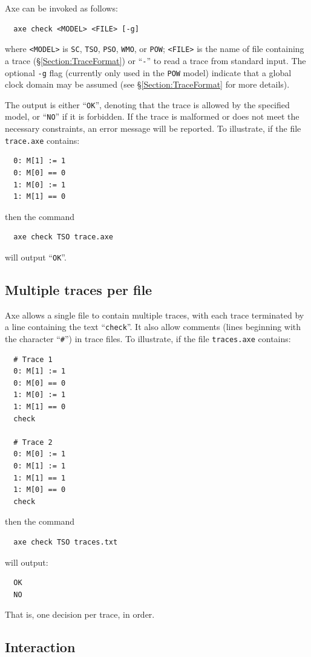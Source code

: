 \documentclass[11pt]{article}
\begin{document}
Axe can be invoked as follows:
\begin{verbatim}
  axe check <MODEL> <FILE> [-g]
\end{verbatim}
\noindent where \verb!<MODEL>! is \verb!SC!, \verb!TSO!, \verb!PSO!,
\verb!WMO!, or \verb!POW!; \verb!<FILE>! is the name of file
containing a trace (\S\ref{Section:TraceFormat}) or ``\verb!-!'' to read a
trace from standard input.  The optional \verb!-g! flag (currently
only used in the \verb!POW! model) indicate that a global clock domain
may be assumed (see \S\ref{Section:TraceFormat} for more details).

The output is either ``\verb!OK!'', denoting that the trace is allowed by
the specified model, or ``\verb!NO!'' if it is forbidden.  If the trace is
malformed or does not meet the necessary constraints, an error message
will be reported.
To illustrate, if the file \verb!trace.axe! contains:
\begin{verbatim}
  0: M[1] := 1
  0: M[0] == 0
  1: M[0] := 1
  1: M[1] == 0
\end{verbatim}
\noindent then the command
\begin{verbatim}
  axe check TSO trace.axe
\end{verbatim}
\noindent will output ``\verb!OK!''.

\subsection*{Multiple traces per file}

Axe allows a single file to contain multiple traces, with each trace
terminated by a line containing the text ``\verb!check!''.  It also allow
comments (lines beginning with the character ``\verb!#!'') in trace
files.
To illustrate, if the file \verb!traces.axe! contains:
\begin{verbatim}
  # Trace 1
  0: M[1] := 1
  0: M[0] == 0
  1: M[0] := 1
  1: M[1] == 0
  check

  # Trace 2
  0: M[0] := 1
  0: M[1] := 1
  1: M[1] == 1
  1: M[0] == 0
  check
\end{verbatim}
\noindent then the command
\begin{verbatim}
  axe check TSO traces.txt
\end{verbatim}
\noindent will output:
\begin{verbatim}
  OK
  NO
\end{verbatim}
\noindent That is, one decision per trace, in order.

\subsection*{Interaction}
\end{document}
